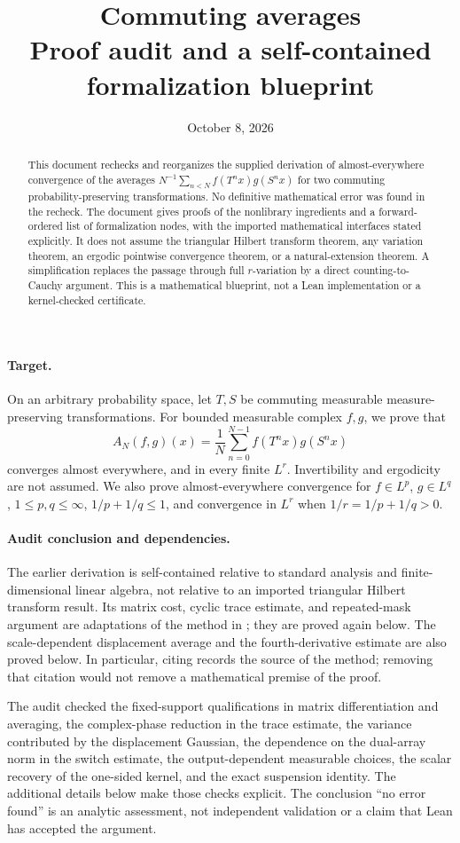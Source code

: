 \documentclass[11pt]{article}
\title{Commuting averages\\[4pt]\large Proof audit and a self-contained formalization blueprint}
\author{}\date{October 8, 2026}
\theoremstyle{remark}\newtheorem{remark}[theorem]{Remark}
\begin{document}
\maketitle
\begin{abstract}
This document rechecks and reorganizes the supplied derivation of almost-everywhere convergence of the averages $N^{-1}\sum_{n<N}f(T^nx)g(S^nx)$ for two commuting probability-preserving transformations. No definitive mathematical error was found in the recheck. The document gives proofs of the nonlibrary ingredients and a forward-ordered list of formalization nodes, with the imported mathematical interfaces stated explicitly. It does not assume the triangular Hilbert transform theorem, any variation theorem, an ergodic pointwise convergence theorem, or a natural-extension theorem. A simplification replaces the passage through full $r$-variation by a direct counting-to-Cauchy argument. This is a mathematical blueprint, not a Lean implementation or a kernel-checked certificate.
\end{abstract}
\paragraph{Target.}
On an arbitrary probability space, let $T,S$ be commuting measurable measure-preserving transformations. For bounded measurable complex $f,g$, we prove that
\[
 A_N(f,g)(x)=\frac1N\sum_{n=0}^{N-1}f(T^nx)g(S^nx)
\]
converges almost everywhere, and in every finite $L^r$. Invertibility and ergodicity are not assumed. We also prove almost-everywhere convergence for $f\in L^p$, $g\in L^q$, $1\le p,q\le\infty$, $1/p+1/q\le1$, and convergence in $L^r$ when $1/r=1/p+1/q>0$.

\paragraph{Audit conclusion and dependencies.}
The earlier derivation is self-contained relative to standard analysis and finite-dimensional linear algebra, not relative to an imported triangular Hilbert transform result. Its matrix cost, cyclic trace estimate, and repeated-mask argument are adaptations of the method in \cite{repo}; they are proved again below. The scale-dependent displacement average and the fourth-derivative estimate are also proved below. In particular, citing \cite{repo} records the source of the method; removing that citation would not remove a mathematical premise of the proof.

The audit checked the fixed-support qualifications in matrix differentiation and averaging, the complex-phase reduction in the trace estimate, the variance contributed by the displacement Gaussian, the dependence on the dual-array norm in the switch estimate, the output-dependent measurable choices, the scalar recovery of the one-sided kernel, and the exact suspension identity. The additional details below make those checks explicit. The conclusion ``no error found'' is an analytic assessment, not independent validation or a claim that Lean has accepted the argument.
\end{document}
